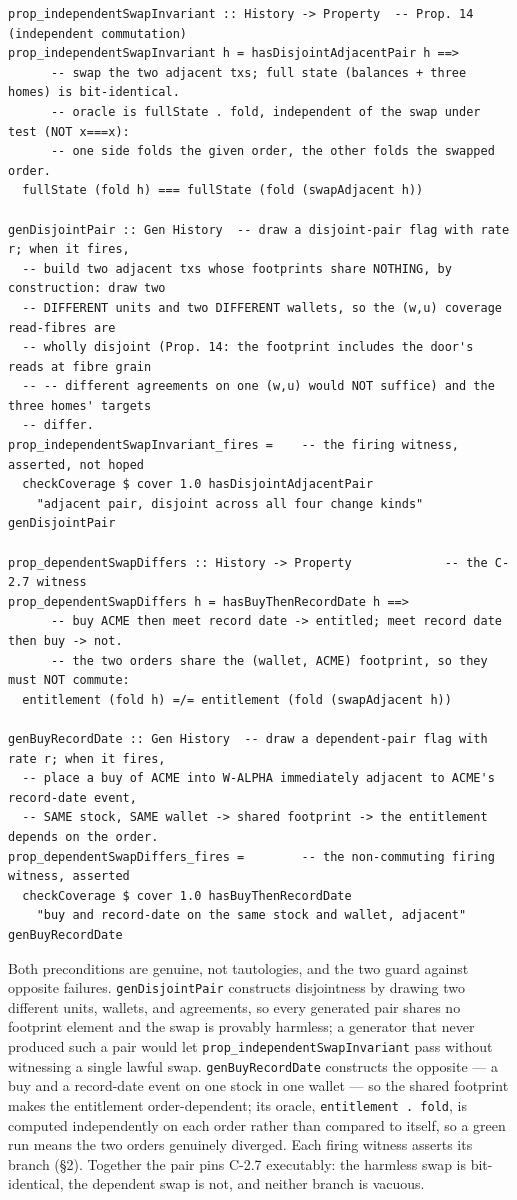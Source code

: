 \documentclass[11pt,a4paper]{article}
\begin{document}
\begin{lstlisting}
prop_independentSwapInvariant :: History -> Property  -- Prop. 14 (independent commutation)
prop_independentSwapInvariant h = hasDisjointAdjacentPair h ==>
      -- swap the two adjacent txs; full state (balances + three homes) is bit-identical.
      -- oracle is fullState . fold, independent of the swap under test (NOT x===x):
      -- one side folds the given order, the other folds the swapped order.
  fullState (fold h) === fullState (fold (swapAdjacent h))

genDisjointPair :: Gen History  -- draw a disjoint-pair flag with rate r; when it fires,
  -- build two adjacent txs whose footprints share NOTHING, by construction: draw two
  -- DIFFERENT units and two DIFFERENT wallets, so the (w,u) coverage read-fibres are
  -- wholly disjoint (Prop. 14: the footprint includes the door's reads at fibre grain
  -- -- different agreements on one (w,u) would NOT suffice) and the three homes' targets
  -- differ.
prop_independentSwapInvariant_fires =    -- the firing witness, asserted, not hoped
  checkCoverage $ cover 1.0 hasDisjointAdjacentPair
    "adjacent pair, disjoint across all four change kinds" genDisjointPair

prop_dependentSwapDiffers :: History -> Property             -- the C-2.7 witness
prop_dependentSwapDiffers h = hasBuyThenRecordDate h ==>
      -- buy ACME then meet record date -> entitled; meet record date then buy -> not.
      -- the two orders share the (wallet, ACME) footprint, so they must NOT commute:
  entitlement (fold h) =/= entitlement (fold (swapAdjacent h))

genBuyRecordDate :: Gen History  -- draw a dependent-pair flag with rate r; when it fires,
  -- place a buy of ACME into W-ALPHA immediately adjacent to ACME's record-date event,
  -- SAME stock, SAME wallet -> shared footprint -> the entitlement depends on the order.
prop_dependentSwapDiffers_fires =        -- the non-commuting firing witness, asserted
  checkCoverage $ cover 1.0 hasBuyThenRecordDate
    "buy and record-date on the same stock and wallet, adjacent" genBuyRecordDate
\end{lstlisting}

Both preconditions are genuine, not tautologies, and the two guard against opposite
failures. \texttt{genDisjointPair} constructs disjointness by drawing two different units,
wallets, and agreements, so every generated pair shares no footprint element and the swap
is provably harmless; a generator that never produced such a pair would let
\texttt{prop\_independentSwapInvariant} pass without witnessing a single lawful swap.
\texttt{genBuyRecordDate} constructs the
opposite --- a buy and a record-date event on one stock in one wallet --- so the shared
footprint makes the entitlement order-dependent; its oracle, \texttt{entitlement . fold},
is computed independently on each order rather than compared to itself, so a green run means
the two orders genuinely diverged. Each firing witness asserts its branch (\S 2). Together the
pair pins C-2.7 executably: the harmless swap is bit-identical, the dependent swap is not,
and neither branch is vacuous.
\end{document}
